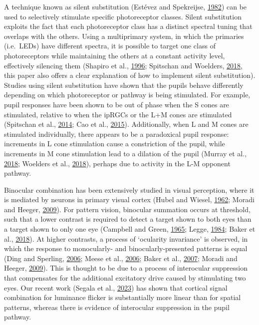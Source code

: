 \documentclass[
]{article}
\begin{document}
A technique known as silent substitution (Estévez and Spekreijse, \protect\hyperlink{ref-Estevez1982}{1982}) can be used to selectively stimulate specific photoreceptor classes. Silent substitution exploits the fact that each photoreceptor class has a distinct spectral tuning that overlaps with the others. Using a multiprimary system, in which the primaries (i.e.~LEDs) have different spectra, it is possible to target one class of photoreceptors while maintaining the others at a constant activity level, effectively silencing them (Shapiro et al., \protect\hyperlink{ref-Shapiro1996}{1996}; Spitschan and Woelders, \protect\hyperlink{ref-Spitschan2018}{2018}, this paper also offers a clear explanation of how to implement silent substitution). Studies using silent substitution have shown that the pupils behave differently depending on which photoreceptor or pathway is being stimulated. For example, pupil responses have been shown to be out of phase when the S cones are stimulated, relative to when the ipRGCs or the L+M cones are stimulated (Spitschan et al., \protect\hyperlink{ref-Spitschan2014}{2014}; Cao et al., \protect\hyperlink{ref-Cao2015}{2015}). Additionally, when L and M cones are stimulated individually, there appears to be a paradoxical pupil response: increments in L cone stimulation cause a constriction of the pupil, while increments in M cone stimulation lead to a dilation of the pupil (Murray et al., \protect\hyperlink{ref-Murray2018}{2018}; Woelders et al., \protect\hyperlink{ref-Woelders2018}{2018}), perhaps due to activity in the L-M opponent pathway.

Binocular combination has been extensively studied in visual perception, where it is mediated by neurons in primary visual cortex (Hubel and Wiesel, \protect\hyperlink{ref-Hubel1962}{1962}; Moradi and Heeger, \protect\hyperlink{ref-Moradi2009}{2009}). For pattern vision, binocular summation occurs at threshold, such that a lower contrast is required to detect a target shown to both eyes than a target shown to only one eye (Campbell and Green, \protect\hyperlink{ref-Campbell1965}{1965}; Legge, \protect\hyperlink{ref-Legge1984}{1984}; Baker et al., \protect\hyperlink{ref-Baker2018}{2018}). At higher contrasts, a process of `ocularity invariance' is observed, in which the response to monocularly- and binocularly-presented patterns is equal (Ding and Sperling, \protect\hyperlink{ref-Ding2006}{2006}; Meese et al., \protect\hyperlink{ref-Meese2006}{2006}; Baker et al., \protect\hyperlink{ref-Baker2007}{2007}; Moradi and Heeger, \protect\hyperlink{ref-Moradi2009}{2009}). This is thought to be due to a process of interocular suppression that compensates for the additional excitatory drive caused by stimulating two eyes. Our recent work (Segala et al., \protect\hyperlink{ref-Segala2023}{2023}) has shown that cortical signal combination for luminance flicker is substantially more linear than for spatial patterns, whereas there is evidence of interocular suppression in the pupil pathway.
\end{document}
